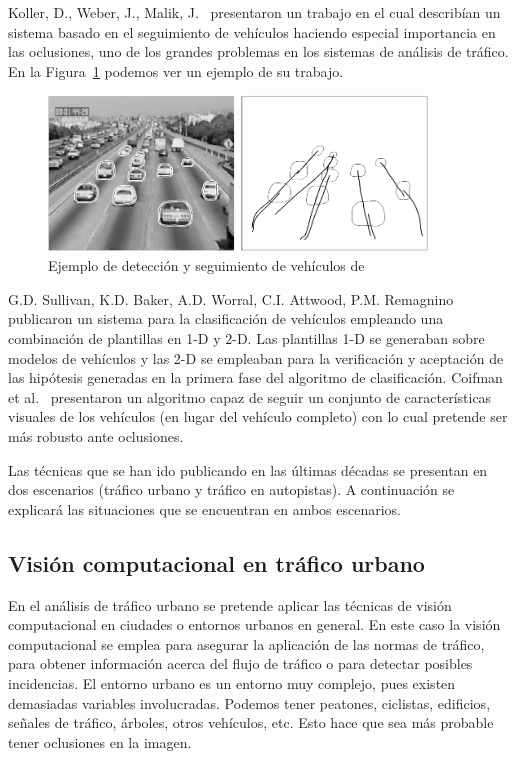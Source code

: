 Koller, D., Weber, J., Malik, J.~\cite{robust_multiple} presentaron un trabajo en el cual describían un sistema basado en el seguimiento de vehículos haciendo especial importancia en las oclusiones, uno de los grandes problemas en los sistemas de análisis de tráfico. En la Figura~\ref{fig.koller_weber_walik_oclusion} podemos ver un ejemplo de su trabajo.

\begin{figure}[H]
  \begin{center}
    \includegraphics[width=0.9\textwidth]{figures/Introduccion/koller_weber_walik_oclusion.png}
		\caption{Ejemplo de detección y seguimiento de vehículos de~\cite{robust_multiple}}
		\label{fig.koller_weber_walik_oclusion}
		\end{center}
\end{figure}

G.D. Sullivan, K.D. Baker, A.D. Worral, C.I. Attwood, P.M. Remagnino~\cite{model_vehicle_detection} publicaron un sistema para la clasificación de vehículos empleando una combinación de plantillas en 1-D  y 2-D. Las plantillas 1-D se generaban sobre modelos de vehículos y las 2-D se empleaban para la verificación y aceptación de las hipótesis generadas en la primera fase del algoritmo de clasificación. Coifman et al.~\cite{areal_time} presentaron un algoritmo capaz de seguir un conjunto de características visuales de los vehículos (en lugar del vehículo completo) con lo cual pretende ser más robusto ante oclusiones.

Las técnicas que se han ido publicando en las últimas décadas se presentan en dos escenarios (tráfico urbano y tráfico en autopistas). A continuación se explicará las situaciones que se encuentran en ambos escenarios.

\subsection{Visión computacional en tráfico urbano}\label{ap.vision_computacion_urbano}

En el análisis de tráfico urbano se pretende aplicar las técnicas de visión computacional en ciudades o entornos urbanos en general. En este caso la visión computacional se emplea para asegurar la aplicación de las normas de tráfico, para obtener información acerca del flujo de tráfico o para detectar posibles incidencias. El entorno urbano es un entorno muy complejo, pues existen demasiadas variables involucradas. Podemos tener peatones, ciclistas, edificios, señales de tráfico, árboles, otros vehículos, etc. Esto hace que sea más probable tener oclusiones en la imagen.

